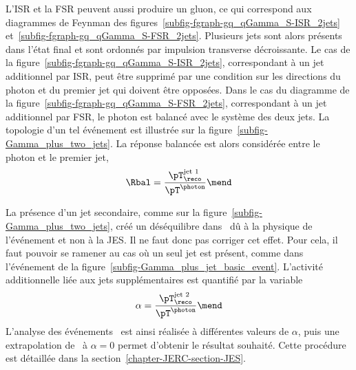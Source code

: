 \par L'ISR et la FSR peuvent aussi produire un gluon, ce qui correspond aux diagrammes de Feynman des figures~\ref{subfig-fgraph-gq_qGamma_S-ISR_2jets} et~\ref{subfig-fgraph-gq_qGamma_S-FSR_2jets}.
Plusieurs jets sont alors présents dans l'état final et sont ordonnés par impulsion transverse décroissante.
Le cas de la figure~\ref{subfig-fgraph-gq_qGamma_S-ISR_2jets}, correspondant à un jet additionnel par ISR, peut être supprimé par une condition sur les directions du photon et du premier jet qui doivent être opposées.
Dans le cas du diagramme de la figure~\ref{subfig-fgraph-gq_qGamma_S-FSR_2jets}, correspondant à un jet additionnel par FSR, le photon est balancé avec le système des deux jets. La topologie d'un tel événement est illustrée sur la figure~\ref{subfig-Gamma_plus_two_jets}.
La réponse balancée est alors considérée entre le photon et le premier jet,%
\begin{equation}
\Rbal = \frac{\pT_\reco^\text{jet 1}}{\pT^{\photon}}
\mend
\end{equation}
\par La présence d'un jet secondaire, comme sur la figure~\ref{subfig-Gamma_plus_two_jets}, créé un déséquilibre dans \Rbal\ dû à la physique de l'événement et non à la JES. Il ne faut donc pas corriger cet effet.
Pour cela, il faut pouvoir se ramener au cas où un seul jet est présent, comme dans l'événement de la figure~\ref{subfig-Gamma_plus_jet_basic_event}.
L'activité additionnelle liée aux jets supplémentaires est quantifié par la variable
\begin{equation}
\alpha = \frac{\pT_\reco^\text{jet 2}}{\pT^{\photon}}
\mend
\label{eq-chapter-JERC-definition_alpha}
\end{equation}
L'analyse des événements \Gjets\ est ainsi réalisée à différentes valeurs de $\alpha$, puis une extrapolation de \Rbal\ à $\alpha=0$ permet d'obtenir le résultat souhaité. Cette procédure est détaillée dans la section~\ref{chapter-JERC-section-JES}.

